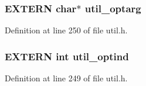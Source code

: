 \subsubsection{\setlength{\rightskip}{0pt plus 5cm}EXTERN char$\ast$ \bf{util\_\-optarg}}\label{util_8h_e4c2571b64c9f2c202909ab0607faf42}




Definition at line 250 of file util.h.
\subsubsection{\setlength{\rightskip}{0pt plus 5cm}EXTERN int \bf{util\_\-optind}}\label{util_8h_71b92df7a9d62f8634a7610c5484f4ca}




Definition at line 249 of file util.h.